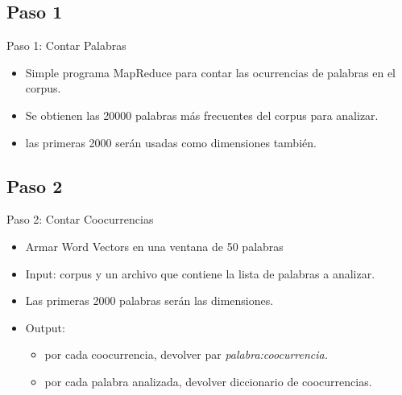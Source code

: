 \documentclass[xcolor=x11names,compress]{beamer}
\renewcommand{\(}{\begin{columns}}
\renewcommand{\)}{\end{columns}}
\newcommand{\<}[1]{\begin{column}{#1}}
\renewcommand{\>}{\end{column}}
\begin{document}
\subsection{Paso 1}
\begin{frame}{Paso 1: Contar Palabras}
\begin{itemize}
\item Simple programa MapReduce para contar las ocurrencias de palabras en el corpus.
\item Se obtienen las 20000 palabras más frecuentes del corpus para analizar.
\item las primeras 2000 serán usadas como dimensiones también.
\end{itemize}
\end{frame}

\subsection{Paso 2}
\begin{frame}{Paso 2: Contar Coocurrencias}
\begin{itemize}
\item Armar Word Vectors en una ventana de 50 palabras
\item Input: corpus y un archivo que contiene la lista de palabras a analizar.
\item Las primeras 2000 palabras serán las dimensiones.
\item Output:
\begin{itemize}
\item[Opción 1] por cada coocurrencia, devolver par \em palabra:coocurrencia\em.
\item[Opción 2] por cada palabra analizada, devolver diccionario de coocurrencias.
\end{itemize}
\end{itemize}
\end{frame}
\end{document}
